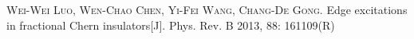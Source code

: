 \begin{publications}{99}

\item\textsc{Wei-Wei Luo, Wen-Chao Chen, Yi-Fei Wang, Chang-De Gong}. {Edge excitations in fractional Chern insulators}[J]. Phys. Rev. B 2013, 88: 161109(R)


\end{publications}